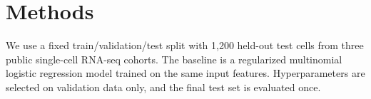 \section{Methods}
We use a fixed train/validation/test split with 1,200 held-out test cells from three public single-cell RNA-seq cohorts. The baseline is a regularized multinomial logistic regression model trained on the same input features. Hyperparameters are selected on validation data only, and the final test set is evaluated once.
